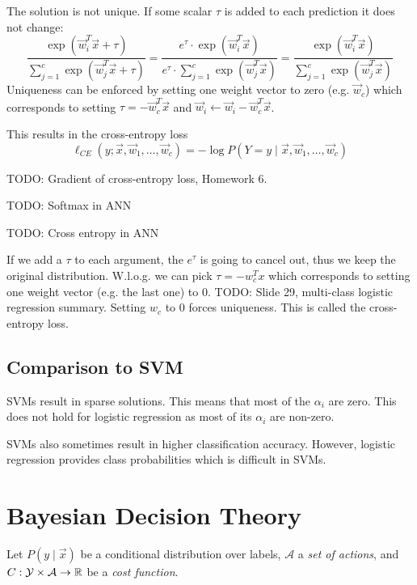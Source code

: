 The solution is not unique.
If some scalar $\tau$ is added to each prediction
it does not change:
\begin{equation*}
\frac{\exp{(\vec{w}_i^T \vec{x} + \tau)}}{
	\sum_{j=1}^c{\exp{(\vec{w}_j^T \vec{x} + \tau)}}
}
= \frac{e^\tau \cdot \exp{(\vec{w}_i^T \vec{x})}}{
	e^\tau \cdot \sum_{j=1}^c{\exp{(\vec{w}_j^T \vec{x})}}
}
= \frac{\exp{(\vec{w}_i^T \vec{x})}}{
	\sum_{j=1}^c{\exp{(\vec{w}_j^T \vec{x})}}
}
\end{equation*}
Uniqueness can be enforced by setting
one weight vector to zero
(e.g. $\vec{w}_c$) which corresponds
to setting $\tau = -\vec{w}_c^T \vec{x}$
and $\vec{w}_i \gets \vec{w}_i - \vec{w}_c^T \vec{x}$.

This results in the cross-entropy loss
\begin{equation*}
\ell_{CE}(y ; \vec{x}, \vec{w}_1, \dotsc, \vec{w}_c)
= - \log{P(Y = y \mid \vec{x}, \vec{w}_1, \dotsc, \vec{w}_c)}
\end{equation*}

TODO: Gradient of cross-entropy loss, Homework 6.

TODO: Softmax in ANN

TODO: Cross entropy in ANN

If we add a $\tau$ to each argument, the $e^\tau$ is going to cancel out,
thus we keep the original distribution.
W.l.o.g. we can pick $\tau = -w_c^T x$ which corresponds to setting one weight vector
(e.g. the last one) to $0$.
TODO: Slide 29, multi-class logistic regression summary.
Setting $w_c$ to $0$ forces uniqueness.
This is called the cross-entropy loss.


\subsection{Comparison to SVM}
SVMs result in sparse solutions.
This means that most of the $\alpha_i$ are zero.
This does not hold for logistic regression as
most of its $\alpha_i$ are non-zero.

SVMs also sometimes result in higher classification
accuracy. However, logistic regression provides
class probabilities which is difficult in SVMs.


\section{Bayesian Decision Theory}
Let $P(y \mid \vec{x})$ be a conditional
distribution over labels,
$\mathcal{A}$ a \emph{set of actions},
and $C : \mathcal{Y} \times \mathcal{A} \to \mathbb{R}$
be a \emph{cost function}.


